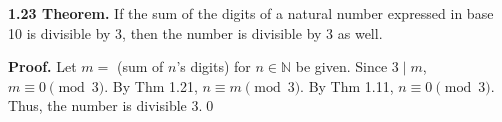 \documentclass[12pt]{article}
\begin{document}
\noindent\textbf{1.23 Theorem.} If the sum of the digits of a natural number expressed in base 10 is divisible by 3, then the number is divisible by 3 as well.

\bigskip

\noindent\textbf{Proof.} Let $m=$ (sum of $n$'s digits) for $n\in\mathbb{N}$ be given. Since $3\mid m$, $m\equiv 0\pmod{3}$. By Thm 1.21, $n\equiv m\pmod{3}$. By Thm 1.11, $n\equiv 0\pmod{3}$. Thus, the number is divisible 3.\qed
\end{document}

